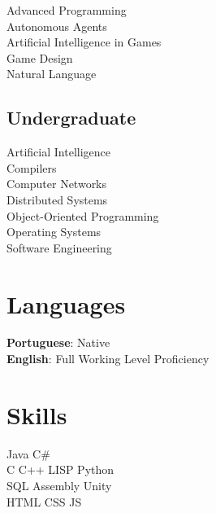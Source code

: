 \documentclass[letterpaper]{deedy-resume} %
\begin{document}
\begin{minipage}[t]{0.33\textwidth}
Advanced Programming \\
Autonomous Agents \\
Artificial Intelligence in Games \\
Game Design\\
Natural Language \\

\sectionspace %


\subsection{Undergraduate}

Artificial Intelligence\\
Compilers\\
Computer Networks\\
Distributed Systems\\
Object-Oriented Programming\\
Operating Systems\\
Software Engineering\\
\sectionspace %



\section{Languages} 
\textbf{Portuguese}: Native\\
\textbf{English}: Full Working Level Proficiency\\

\sectionspace %


\section{Skills}


Java \textbullet{} C\#\\
C \textbullet{} C++ \textbullet{} LISP \textbullet{}  Python  \\
SQL \textbullet{} Assembly \textbullet{} Unity\\
HTML \textbullet{} CSS \textbullet{} JS\\


\sectionspace %

\end{minipage} %
\end{document}
